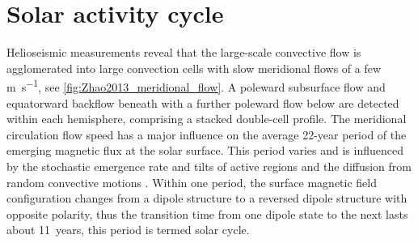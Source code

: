 \section{Solar activity cycle}
\label{sec:solar_activity_cycle}
Helioseismic measurements reveal that the large-scale convective flow is agglomerated into large convection cells with slow meridional flows of a few \si{\m\per\s}, see \autoref{fig:Zhao2013_meridional_flow}. A poleward subsurface flow and equatorward backflow beneath with a further poleward flow below are detected within each hemisphere, comprising a stacked double-cell profile. The meridional circulation flow speed has a major influence on the average 22-year period of the emerging magnetic flux at the solar surface. This period varies and is influenced by the stochastic emergence rate and tilts of active regions and the diffusion from random convective motions \citep{Hathaway2016}. Within one period, the surface magnetic field configuration changes from a dipole structure to a reversed dipole structure with opposite polarity, thus the transition time from one dipole state to the next lasts about 11~years, this period is termed solar cycle.

